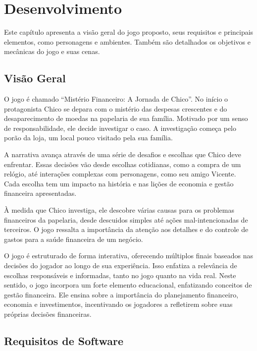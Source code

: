 \chapter{Desenvolvimento}

Este capítulo apresenta a visão geral do jogo proposto, seus requisitos e principais elementos, como personagens e ambientes. Também são detalhados os objetivos e mecânicas do jogo e suas cenas.

\section{Visão Geral}

O jogo é chamado ``Mistério Financeiro: A Jornada de Chico''. No início o protagonista Chico se depara com o mistério das despesas crescentes e do desaparecimento de moedas na papelaria de sua família. Motivado por um senso de responsabilidade, ele decide investigar o caso. A investigação começa pelo porão da loja, um local pouco visitado pela sua família.

A narrativa avança através de uma série de desafios e escolhas que Chico deve enfrentar. Essas decisões vão desde escolhas cotidianas, como a compra de um relógio, até interações complexas com personagens, como seu amigo Vicente. Cada escolha tem um impacto na história e nas lições de economia e gestão financeira apresentadas.

À medida que Chico investiga, ele descobre várias causas para os problemas financeiros da papelaria, desde descuidos simples até ações mal-intencionadas de terceiros. O jogo ressalta a importância da atenção aos detalhes e do controle de gastos para a saúde financeira de um negócio.

O jogo é estruturado de forma interativa, oferecendo múltiplos finais baseados nas decisões do jogador ao longo de sua experiência. Isso enfatiza a relevância de escolhas responsáveis e informadas, tanto no jogo quanto na vida real. Neste sentido, o jogo incorpora um forte elemento educacional, enfatizando conceitos de gestão financeira. Ele ensina sobre a importância do planejamento financeiro, economia e investimentos, incentivando os jogadores a refletirem sobre suas próprias decisões financeiras.

\section{Requisitos de Software}

